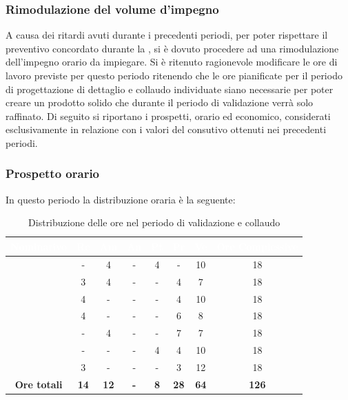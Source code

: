 \subsubsection{Rimodulazione del volume d'impegno}\label{RimodulazioneOre}
A causa dei ritardi avuti durante i precedenti periodi, per poter rispettare il preventivo concordato durante la , si è dovuto procedere ad una rimodulazione dell'impegno orario da impiegare.
Si è ritenuto ragionevole modificare le ore di lavoro previste per questo periodo ritenendo che le ore pianificate per il periodo di progettazione di dettaglio e collaudo individuate siano necessarie per poter creare un prodotto solido che durante il periodo di validazione verrà solo raffinato. Di seguito si riportano i prospetti, orario ed economico, considerati esclusivamente in relazione con i valori del consutivo ottenuti nei precedenti periodi.
\subsubsection{Prospetto orario}
In questo periodo la distribuzione oraria è la seguente:
\begin{table}[H]
	\begin{center}
		\begin{tabular}{ |c c c c c c c c| }
			\rowcolor{darkblue} 
			\textcolor{white}{\textbf{Nominativo}} & \textcolor{white}{\textbf{Re}} & \textcolor{white}{\textbf{Am}} & \textcolor{white}{\textbf{An}} & \textcolor{white}{\textbf{Pt}} & \textcolor{white}{\textbf{Pr}} & \textcolor{white}{\textbf{Ve}} & \textcolor{white}{\textbf{Ore Complessive}} \\ \hline
			\BL 	& -  	& 4  	& - 	& 4 	& - 	& 10 	& 18 \\ \hline
			\FF 	& 3  	& 4  	& - 	& - 	& 4 	& 7  	& 18 \\ \hline
			\MM 	& 4 	& - 	& - 	& - 	& 4 	& 10  	& 18 \\ \hline
			\PC 	& 4 	& -  	& - 	& - 	& 6 	& 8 	& 18 \\ \hline
			\TG 	& -  	& 4 	& - 	& - 	& 7 	& 7 	& 18 \\ \hline
			\TL 	& -  	& - 	& - 	& 4 	& 4 	& 10 	& 18 \\ \hline
			\VD 	& 3  	& -  	& - 	& - 	& 3 	& 12  	& 18 \\ \hline
			\textbf{Ore totali} & \textbf{14} & \textbf{12} & \textbf{-} & \textbf{8} & \textbf{28} & \textbf{64} & \textbf{126} \\ \hline
		\end{tabular}
		\caption{Distribuzione delle ore nel periodo di validazione e collaudo}
	\end{center}
\end{table}
